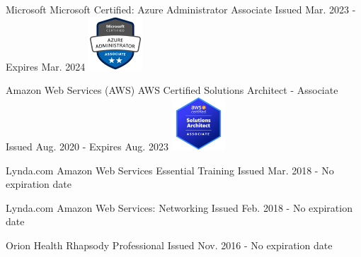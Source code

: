 \graphicspath{ {./images/} }




\begin{cventries}


\cventry
{Microsoft\vspace{2mm}} %
{Microsoft Certified: Azure Administrator Associate} %
{} %
{Issued Mar. 2023 - Expires Mar. 2024} %
{ %
\includegraphics[height=2cm]{azure}
}


\cventry
{Amazon Web Services (AWS)\vspace{2mm}} %
{AWS Certified Solutions Architect - Associate} %
{} %
{Issued Aug. 2020 - Expires Aug. 2023} %
{ %
\includegraphics[height=2cm]{aws}
}


\cventry
{Lynda.com} %
{Amazon Web Services Essential Training} %
{} %
{Issued Mar. 2018 - No expiration date} %
{ %
}


\cventry
{Lynda.com} %
{Amazon Web Services: Networking} %
{} %
{Issued Feb. 2018 - No expiration date} %
{ %
}


\cventry
{Orion Health} %
{Rhapsody Professional} %
{} %
{Issued Nov. 2016 - No expiration date} %
{ %
}


\end{cventries}
